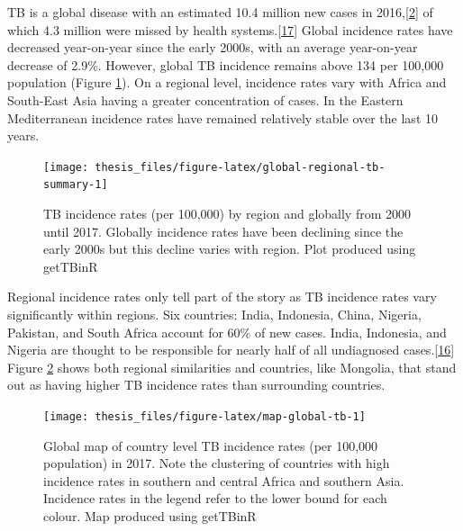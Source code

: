 \documentclass[11pt,twoside]{bristolthesis}
\begin{document}
  TB is a global disease with an estimated 10.4 million new cases in 2016,{[}\protect\hyperlink{ref-TheWorldHealthOrganization:2018va}{2}{]} of which 4.3 million were missed by health systems.{[}\protect\hyperlink{ref-WHO:2018}{17}{]} Global incidence rates have decreased year-on-year since the early 2000s, with an average year-on-year decrease of 2.9\%. However, global TB incidence remains above 134 per 100,000 population (Figure \ref{fig:global-regional-tb-summary}). On a regional level, incidence rates vary with Africa and South-East Asia having a greater concentration of cases. In the Eastern Mediterranean incidence rates have remained relatively stable over the last 10 years.
  \begin{figure}
  
  {\centering \texttt{[image: thesis\_files/figure-latex/global-regional-tb-summary-1]} 
  
  }
  
  \caption[TB incidence rates (per 100,000) by region and globally from 2000 until 2017.]{TB incidence rates (per 100,000) by region and globally from 2000 until 2017. Globally incidence rates have been declining since the early 2000s but this decline varies with region. Plot produced using getTBinR}\label{fig:global-regional-tb-summary}
  \end{figure}
  Regional incidence rates only tell part of the story as TB incidence rates vary significantly within regions. Six countries: India, Indonesia, China, Nigeria, Pakistan, and South Africa account for 60\% of new cases. India, Indonesia, and Nigeria are thought to be responsible for nearly half of all undiagnosed cases.{[}\protect\hyperlink{ref-WHOTB2016}{16}{]} Figure \ref{fig:map-global-tb} shows both regional similarities and countries, like Mongolia, that stand out as having higher TB incidence rates than surrounding countries.
  \begin{figure}
  
  {\centering \texttt{[image: thesis\_files/figure-latex/map-global-tb-1]} 
  
  }
  
  \caption[Global map of country level TB incidence rates (per 100,000 population) in 201]{Global map of country level TB incidence rates (per 100,000 population) in 2017. Note the clustering of countries with high incidence rates in southern and central Africa and southern Asia. Incidence rates in the legend refer to the lower bound for each colour. Map produced using getTBinR}\label{fig:map-global-tb}
  \end{figure}
\end{document}
